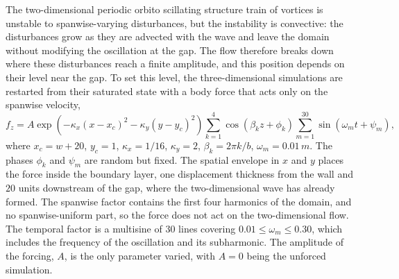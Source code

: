 \documentclass[lineno]{jfm}
\begin{document}
The two-dimensional periodic orbito scillating structure train of vortices is unstable to spanwise-varying disturbances, but the instability is convective: the disturbances grow as they are advected with the wave and leave the domain without modifying the oscillation at the gap. The flow therefore breaks down where these disturbances reach a finite amplitude, and this position depends on their level near the gap. To set this level, the three-dimensional simulations are restarted from their saturated state with a body force that acts only on the spanwise velocity,
\begin{equation}\label{eq:seedForcing}
	f_z = A\exp{\left(-\kappa_x{(x-x_c)}^2-\kappa_y{(y-y_c)}^2\right)}\sum_{k=1}^{4}\cos(\beta_k z+\phi_k)\sum_{m=1}^{30}\sin(\omega_m t+\psi_m),
\end{equation}
where $x_c=w+20$, $y_c=1$, $\kappa_x=1/16$, $\kappa_y=2$, $\beta_k=2\pi k/b$, $\omega_m=0.01\,m$. The phases $\phi_k$ and $\psi_m$ are random but fixed. The spatial envelope in $x$ and $y$ places the force inside the boundary layer, one displacement thickness from the wall and $20$ units downstream of the gap, where the two-dimensional wave has already formed. The spanwise factor contains the first four harmonics of the domain, and no spanwise-uniform part, so the force does not act on the two-dimensional flow. The temporal factor is a multisine of $30$ lines covering $0.01\leq\omega_m\leq0.30$, which includes the frequency of the oscillation and its subharmonic. The amplitude of the forcing, $A$, is the only parameter varied, with $A=0$ being the unforced simulation.
\end{document}
